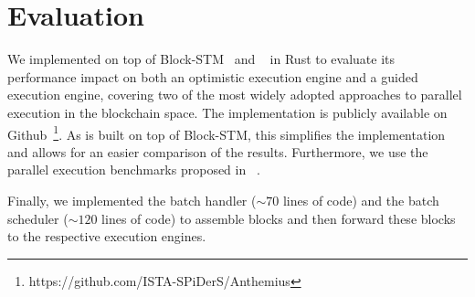 \section{Evaluation}
\label{sec:evaluation}


We implemented \sys on top of Block-STM~\cite{blockstm} and \basesys~\cite{chiron} in Rust to evaluate its performance impact on both an optimistic execution engine and a guided execution engine, covering two of the most widely adopted approaches to parallel execution in the blockchain space.
The implementation is publicly available on Github~\footnote{https://github.com/ISTA-SPiDerS/Anthemius}.
As \basesys is built on top of Block-STM, this simplifies the implementation and allows for an easier comparison of the results.
Furthermore, we use the parallel execution benchmarks proposed in \basesys~\cite{chiron}. 



Finally, we implemented the batch handler ($\sim70$ lines of code) and the batch scheduler ($\sim120$ lines of code) to assemble blocks and then forward these blocks to the respective execution engines.





